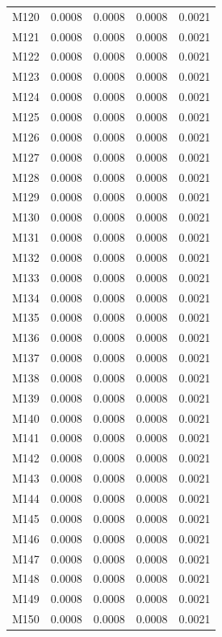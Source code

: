 \begin{longtable}{lrrrr}
M120 & 0.0008 & 0.0008 & 0.0008 & 0.0021 \\
M121 & 0.0008 & 0.0008 & 0.0008 & 0.0021 \\
M122 & 0.0008 & 0.0008 & 0.0008 & 0.0021 \\
M123 & 0.0008 & 0.0008 & 0.0008 & 0.0021 \\
M124 & 0.0008 & 0.0008 & 0.0008 & 0.0021 \\
M125 & 0.0008 & 0.0008 & 0.0008 & 0.0021 \\
M126 & 0.0008 & 0.0008 & 0.0008 & 0.0021 \\
M127 & 0.0008 & 0.0008 & 0.0008 & 0.0021 \\
M128 & 0.0008 & 0.0008 & 0.0008 & 0.0021 \\
M129 & 0.0008 & 0.0008 & 0.0008 & 0.0021 \\
M130 & 0.0008 & 0.0008 & 0.0008 & 0.0021 \\
M131 & 0.0008 & 0.0008 & 0.0008 & 0.0021 \\
M132 & 0.0008 & 0.0008 & 0.0008 & 0.0021 \\
M133 & 0.0008 & 0.0008 & 0.0008 & 0.0021 \\
M134 & 0.0008 & 0.0008 & 0.0008 & 0.0021 \\
M135 & 0.0008 & 0.0008 & 0.0008 & 0.0021 \\
M136 & 0.0008 & 0.0008 & 0.0008 & 0.0021 \\
M137 & 0.0008 & 0.0008 & 0.0008 & 0.0021 \\
M138 & 0.0008 & 0.0008 & 0.0008 & 0.0021 \\
M139 & 0.0008 & 0.0008 & 0.0008 & 0.0021 \\
M140 & 0.0008 & 0.0008 & 0.0008 & 0.0021 \\
M141 & 0.0008 & 0.0008 & 0.0008 & 0.0021 \\
M142 & 0.0008 & 0.0008 & 0.0008 & 0.0021 \\
M143 & 0.0008 & 0.0008 & 0.0008 & 0.0021 \\
M144 & 0.0008 & 0.0008 & 0.0008 & 0.0021 \\
M145 & 0.0008 & 0.0008 & 0.0008 & 0.0021 \\
M146 & 0.0008 & 0.0008 & 0.0008 & 0.0021 \\
M147 & 0.0008 & 0.0008 & 0.0008 & 0.0021 \\
M148 & 0.0008 & 0.0008 & 0.0008 & 0.0021 \\
M149 & 0.0008 & 0.0008 & 0.0008 & 0.0021 \\
M150 & 0.0008 & 0.0008 & 0.0008 & 0.0021 \\

\end{longtable}
